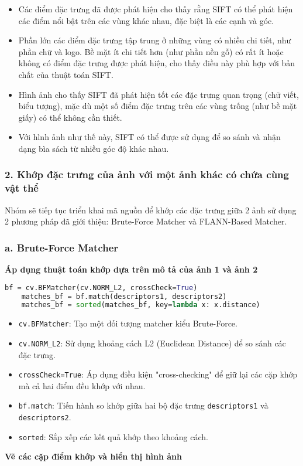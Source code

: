 \begin{itemize}
	\item Các điểm đặc trưng đã được phát hiện cho thấy rằng SIFT có thể phát hiện các điểm nổi bật trên các vùng khác nhau, đặc biệt là các cạnh và góc.
	
	\item Phần lớn các điểm đặc trưng tập trung ở những vùng có nhiều chi tiết, như phần chữ và logo. Bề mặt ít chi tiết hơn (như phần nền gỗ) có rất ít hoặc không có điểm đặc trưng được phát hiện, cho thấy điều này phù hợp với bản chất của thuật toán SIFT.
	
	\item Hình ảnh cho thấy SIFT đã phát hiện tốt các đặc trưng quan trọng (chữ viết, biểu tượng), mặc dù một số điểm đặc trưng trên các vùng trống (như bề mặt giấy) có thể không cần thiết.
	
	\item Với hình ảnh như thế này, SIFT có thể được sử dụng để so sánh và nhận dạng bìa sách từ nhiều góc độ khác nhau.
\end{itemize}


\subsubsection*{2. Khớp đặc trưng của ảnh với một ảnh khác có chứa cùng vật thể}

Nhóm sẽ tiếp tục triển khai mã nguồn để khớp các đặc trưng giữa 2 ảnh sử dụng 2 phương pháp đã giới thiệu: Brute-Force Matcher và FLANN-Based Matcher.

\subsubsection*{a. Brute-Force Matcher}

\textbf{Áp dụng thuật toán khớp dựa trên mô tả của ảnh 1 và ảnh 2}

\begin{lstlisting}[language=Python]
	bf = cv.BFMatcher(cv.NORM_L2, crossCheck=True)
	matches_bf = bf.match(descriptors1, descriptors2)
	matches_bf = sorted(matches_bf, key=lambda x: x.distance)
\end{lstlisting}

\begin{itemize}
	\item \texttt{cv.BFMatcher}: Tạo một đối tượng matcher kiểu Brute-Force.
	\item \texttt{cv.NORM\_L2}: Sử dụng khoảng cách L2 (Euclidean Distance) để so sánh các đặc trưng.
	\item \texttt{crossCheck=True}: Áp dụng điều kiện "cross-checking" để giữ lại các cặp khớp mà cả hai điểm đều khớp với nhau.
	\item \texttt{bf.match}: Tiến hành so khớp giữa hai bộ đặc trưng \texttt{descriptors1} và \texttt{descriptors2}.
	\item \texttt{sorted}: Sắp xếp các kết quả khớp theo khoảng cách.
\end{itemize}
\textbf{Vẽ các cặp điểm khớp và hiển thị hình ảnh}

